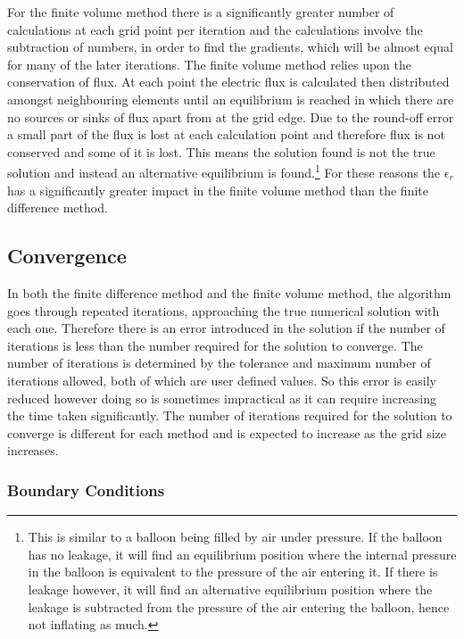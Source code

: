 \documentclass[aps,twocolumn,pre,nofootinbib,10pt]{revtex4-1}
\begin{document}
For the finite volume method there is a significantly greater number of calculations at each grid point per iteration and the calculations involve the subtraction of numbers, in order to find the gradients, which will be almost equal for many of the later iterations. The finite volume method relies upon the conservation of flux. At each point the electric flux is calculated then distributed amongst neighbouring elements until an equilibrium is reached in which there are no sources or sinks of flux apart from at the grid edge. Due to the round-off error a small part of the flux is lost at each calculation point and therefore flux is not conserved and some of it is lost. This means the solution found is not the true solution and instead an alternative equilibrium is found.\footnote{This is similar to a balloon being filled by air under pressure. If the balloon has no leakage, it will find an equilibrium position where the internal pressure in the balloon is equivalent to the pressure of the air entering it. If 
there is leakage however, it will find an alternative equilibrium position where the leakage is subtracted from the pressure of the air entering the balloon, hence not inflating as much.}  For these reasons the \(\epsilon_r\) has a significantly greater impact in the finite volume method than the finite difference method.


\subsection{Convergence}

In both the finite difference method and the finite volume method, the algorithm goes through repeated iterations, approaching the true numerical solution with each one. Therefore there is an error introduced in the solution if the number of iterations is less than the number required for the solution to converge. The number of iterations is determined by the tolerance and maximum number of iterations allowed, both of which are user defined values. So this error is easily reduced however doing so is sometimes impractical as it can require increasing the time taken significantly. The number of iterations required for the solution to converge is different for each method and is expected to increase as the grid size increases.



\subsubsection{Boundary Conditions}
\end{document}
